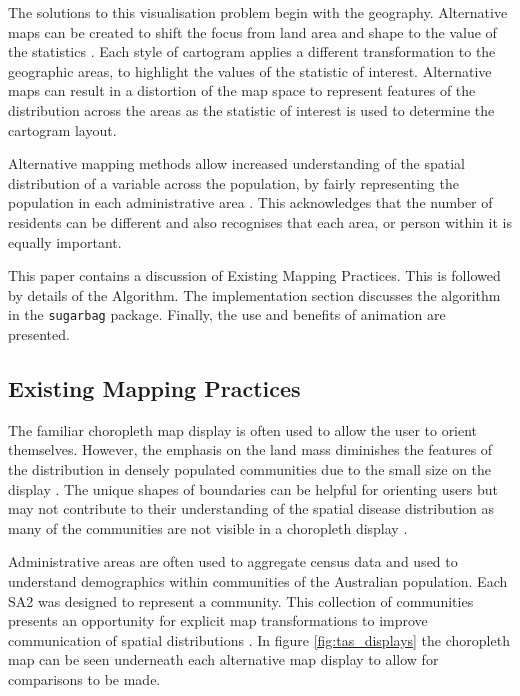 The solutions to this visualisation problem begin with the geography.
Alternative maps can be created to shift the focus from land area and
shape to the value of the statistics \citep{ACCAC}. Each style of
cartogram applies a different transformation to the geographic areas, to
highlight the values of the statistic of interest. Alternative maps can
result in a distortion of the map space to represent features of the
distribution across the areas \citep{ACCAC} as the statistic of interest
is used to determine the cartogram layout.

Alternative mapping methods allow increased understanding of the spatial
distribution of a variable across the population, by fairly representing
the population in each administrative area \citep{TAAM}. This
acknowledges that the number of residents can be different and also
recognises that each area, or person within it is equally important.

This paper contains a discussion of Existing Mapping Practices. This is
followed by details of the Algorithm. The implementation section
discusses the algorithm in the \texttt{sugarbag} package. Finally, the
use and benefits of animation are presented.

\hypertarget{existing-mapping-practices}{%
\subsection{Existing Mapping
Practices}\label{existing-mapping-practices}}

The familiar choropleth map display is often used to allow the user to
orient themselves. However, the emphasis on the land mass diminishes the
features of the distribution in densely populated communities due to the
small size on the display \citep{ACTUC}. The unique shapes of boundaries
can be helpful for orienting users but may not contribute to their
understanding of the spatial disease distribution as many of the
communities are not visible in a choropleth display \citep{TVSSS}.

Administrative areas are often used to aggregate census data and used to
understand demographics within communities of the Australian population.
Each SA2 \citep{abs2011} was designed to represent a community. This
collection of communities presents an opportunity for explicit map
transformations to improve communication of spatial distributions
\citep{CBATCC}. In figure \ref{fig:tas_displays} the choropleth map can
be seen underneath each alternative map display to allow for comparisons
to be made.

